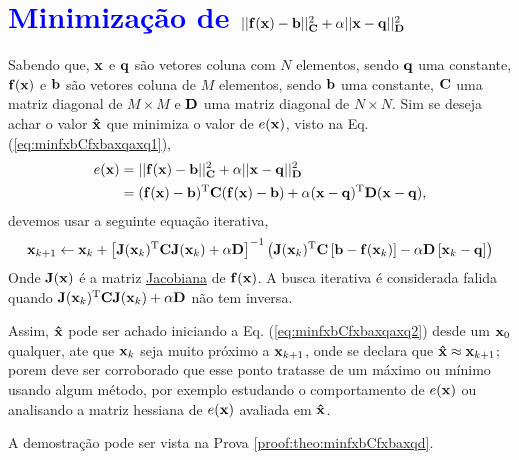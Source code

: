 

\section{\textcolor{blue}{Minimização de $||\VECTOR{f}(\VECTOR{x})-\VECTOR{b}||_{\MATRIX{C}}^2+\alpha||\VECTOR{x}-\VECTOR{q}||_{\MATRIX{D}}^2$}
}

\begin{theorem}\label{theo:minfxbCfxbaxqaxq}
Sabendo que, $\VECTOR{x}$ e $\VECTOR{q}$ são vetores coluna com $N$ elementos, sendo $\VECTOR{q}$ uma constante, $\VECTOR{f}(\VECTOR{x})$ e 
$\VECTOR{b}$ são vetores coluna de $M$ elementos, sendo $\VECTOR{b}$ uma constante,
$\MATRIX{C}$ uma matriz diagonal de $M \times M$ e 
$\MATRIX{D}$ uma matriz diagonal de $N \times N$.
Sim se deseja achar o valor $\VECTOR{\hat{x}}$ que minimiza o valor de $e(\VECTOR{x})$, visto na Eq. (\ref{eq:minfxbCfxbaxqaxq1}),
\begin{align}\label{eq:minfxbCfxbaxqaxq1}
e(\VECTOR{x}) &=||\VECTOR{f}(\VECTOR{x})-\VECTOR{b}||_{\MATRIX{C}}^2+\alpha||\VECTOR{x}-\VECTOR{q}||_{\MATRIX{D}}^2\\
              & = (\VECTOR{f}(\VECTOR{x})-\VECTOR{b})^{\transpose}\MATRIX{C}(\VECTOR{f}(\VECTOR{x})-\VECTOR{b})+\alpha(\VECTOR{x}-\VECTOR{q})^{\transpose}\MATRIX{D}(\VECTOR{x}-\VECTOR{q}),
\end{align}
devemos usar a seguinte equação iterativa,
\begin{equation}\label{eq:minfxbCfxbaxqaxq2}
\VECTOR{x}_{k+1}\leftarrow \VECTOR{x}_k+
\left[ \MATRIX{J}(\VECTOR{x}_k)^{\transpose}\MATRIX{C} \MATRIX{J}(\VECTOR{x}_k) +\alpha\MATRIX{D} \right]^{-1}
 \left(\MATRIX{J}(\VECTOR{x}_k)^{\transpose}\MATRIX{C}\left[\VECTOR{b}-\VECTOR{f}(\VECTOR{x}_k)\right]-\alpha\MATRIX{D}\left[\VECTOR{x}_k-\VECTOR{q}\right]\right)
\end{equation}
Onde  $\MATRIX{J}(\VECTOR{x})$ é a matriz \hyperref[def:jacobian]{Jacobiana} \cite{Jacobian} de $\VECTOR{f}(\VECTOR{x})$.
A busca iterativa é considerada falida quando 
$\MATRIX{J}(\VECTOR{x}_k)^{\transpose}\MATRIX{C} \MATRIX{J}(\VECTOR{x}_k) +\alpha\MATRIX{D}$
não tem inversa.


Assim, $\VECTOR{\hat{x}}$ pode ser achado iniciando a Eq. (\ref{eq:minfxbCfxbaxqaxq2}) desde um $\VECTOR{x}_{0}$ qualquer, ate que $\VECTOR{x}_{k}$ seja muito próximo a $\VECTOR{x}_{k+1}$,
onde se declara que $\VECTOR{\hat{x}} \approx \VECTOR{x}_{k+1}$; porem deve ser corroborado
que esse ponto tratasse de um máximo ou mínimo usando algum método, por exemplo estudando o comportamento 
de $e(\VECTOR{x})$ ou analisando a matriz hessiana de $e(\VECTOR{x})$ avaliada em $\VECTOR{\hat{x}}$.

A demostração pode ser vista na Prova \ref{proof:theo:minfxbCfxbaxqd}.
\end{theorem} 

